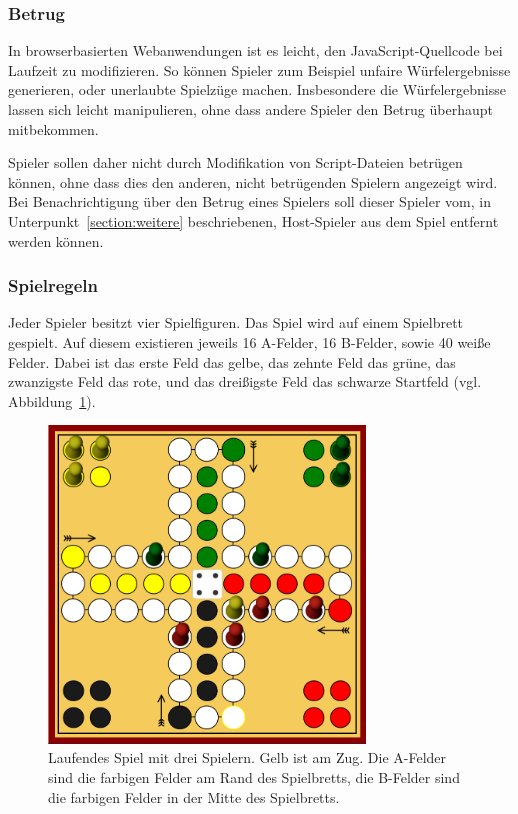 \subsubsection{Betrug}
In browserbasierten Webanwendungen ist es leicht, den JavaScript-Quellcode bei Laufzeit zu modifizieren. So können Spieler zum Beispiel unfaire Würfelergebnisse generieren, oder unerlaubte Spielzüge machen. Insbesondere die Würfelergebnisse lassen sich leicht manipulieren, ohne dass andere Spieler den Betrug überhaupt mitbekommen.\par

Spieler sollen daher nicht durch Modifikation von Script-Dateien betrügen können, ohne dass dies den anderen, nicht betrügenden Spielern angezeigt wird. Bei Benachrichtigung über den Betrug eines Spielers soll dieser Spieler vom, in Unterpunkt~\ref{section:weitere} beschriebenen, \glqq{}Host\grqq{}-Spieler aus dem Spiel entfernt werden können.\par

\subsubsection{Spielregeln}
Jeder Spieler besitzt vier Spielfiguren. Das Spiel wird auf einem Spielbrett gespielt. Auf diesem existieren jeweils 16 A-Felder, 16 B-Felder, sowie 40 weiße Felder. Dabei ist das erste Feld das gelbe, das zehnte Feld das grüne, das zwanzigste Feld das rote, und das dreißigste Feld das schwarze Startfeld (vgl. Abbildung~\ref{fig:maedngame}).\par 

\vspace{6pt}
\begin{figure}[h]
\centering
\includegraphics[width=0.75\textwidth]{bilder/game-in-progress.png}
\caption{Laufendes Spiel mit drei Spielern. Gelb ist am Zug. Die A-Felder sind die farbigen Felder am Rand des Spielbretts, die B-Felder sind die farbigen Felder in der Mitte des Spielbretts.}
\label{fig:maedngame}
\end{figure}


